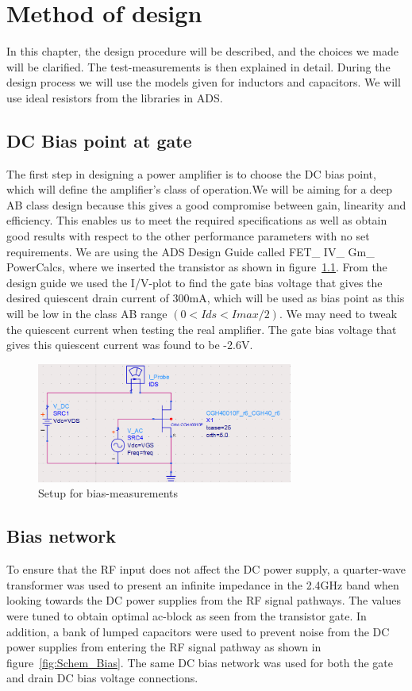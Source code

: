 \chapter{Method of design}
  In this chapter, the design procedure will be described, and the choices we made will be clarified. The test-measurements is then explained in detail. During the design process we will use the models given for inductors and capacitors. We will use ideal resistors from the libraries in ADS.
  \section{DC Bias point at gate}
    The first step in designing a power amplifier is to choose the DC bias point, which will define the amplifier’s class of operation.We will be aiming for a deep AB class design because this gives a good compromise between gain, linearity and efficiency. This enables us to meet the required specifications as well as obtain good results with respect to the other performance parameters with no set requirements.
    We are using the ADS Design Guide called FET\_ IV\_ Gm\_ PowerCalcs, where we inserted the transistor as shown in figure~\ref{fig:fig_bias_sim}. From the design guide we used the I/V-plot to find the gate bias voltage that gives the desired quiescent drain current of 300mA, which will be used as bias point as this will be low in the class AB range $(0 < Ids < Imax/2)$. We may need to tweak the quiescent current when testing the real amplifier. The gate bias voltage that gives this quiescent current was found to be -2.6V.

  \begin{figure}[h]
	  \centering
	  \includegraphics[width=0.75\textwidth]{img/IV_simulation}
	  \caption{Setup for bias-measurements}
	  \label{fig:fig_bias_sim}
  \end{figure}

  \section{Bias network}
  To ensure that the RF input does not affect the DC power supply, a quarter-wave transformer was used to present an infinite impedance in the 2.4GHz band when looking towards the DC power supplies from the RF signal pathways. The values were tuned to obtain optimal ac-block as seen from the transistor gate. In addition, a bank of lumped capacitors were used to prevent noise from the DC power supplies from entering the RF signal pathway as shown in figure~\ref{fig:Schem_Bias}. The same DC bias network was used for both the gate and drain DC bias voltage connections.
  
